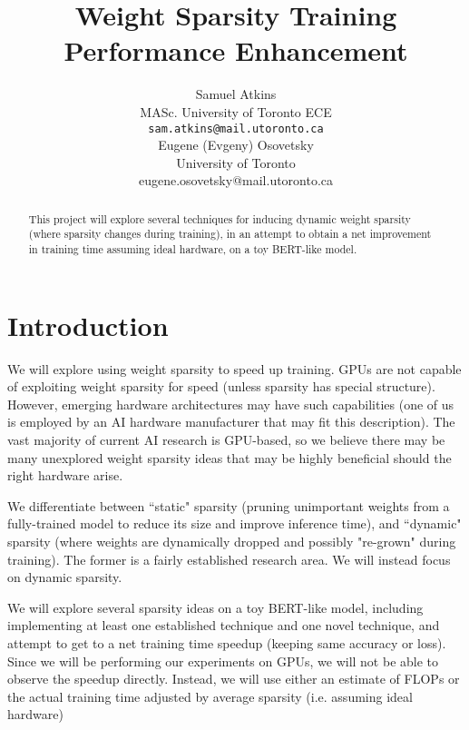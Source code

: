 \documentclass{article}
\title{Weight Sparsity Training Performance Enhancement}
\author{%
  Samuel Atkins\\
  MASc. University of Toronto ECE\\
  \texttt{sam.atkins@mail.utoronto.ca}\\
  \And Eugene (Evgeny) Osovetsky\\
  University of Toronto\\
  eugene.osovetsky@mail.utoronto.ca
}
\begin{document}
\maketitle


\begin{abstract}
This project will explore several techniques for inducing dynamic weight sparsity (where sparsity changes during training), in an attempt to obtain a net improvement in training time assuming ideal hardware, on a toy BERT-like model.
\end{abstract}

\section*{Introduction}

We will explore using weight sparsity to speed up training. GPUs are not capable of exploiting weight sparsity for speed (unless sparsity has special structure). However, emerging hardware architectures may have such capabilities (one of us is employed by an AI hardware manufacturer that may fit this description). The vast majority of current AI research is GPU-based, so we believe there may be many unexplored weight sparsity ideas that may be highly beneficial should the right hardware arise.

We differentiate between ``static" sparsity (pruning unimportant weights from a fully-trained model to reduce its size and improve inference time), and ``dynamic" sparsity (where weights are dynamically dropped and possibly "re-grown" during training). The former is a fairly established research area. We will instead focus on dynamic sparsity.

We will explore several sparsity ideas on a toy BERT-like model, including implementing at least one established technique and one novel technique, and attempt to get to a net training time speedup (keeping same accuracy or loss). Since we will be performing our experiments on GPUs, we will not be able to observe the speedup directly. Instead, we will use either an estimate of FLOPs or the actual training time adjusted by average sparsity (i.e. assuming ideal hardware)
\end{document}

